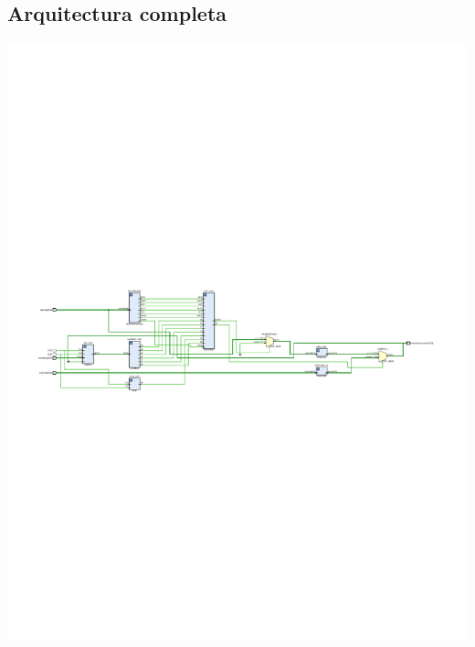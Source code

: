 \documentclass[8pt,executivepaper]{article}
\begin{document}
\subsection{Arquitectura completa}
\begin{center}
  \includegraphics[scale=0.75]{rtl/arquitectura.pdf}
\end{center}
\end{document}
